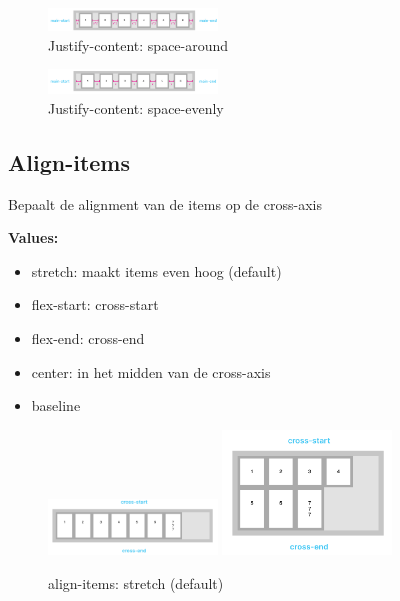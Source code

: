 \documentclass{article}
\newcommand{\bold}[1]{\textbf{#1}}
\begin{document}
\begin{figure}[H]
    \centering
    \includegraphics[width=0.4\textwidth]{img/Screenshot_20200427_093824.png}
    \caption{Justify-content: space-around}
\end{figure}

\begin{figure}[H]
    \centering
    \includegraphics[width=0.4\textwidth]{img/Screenshot_20200427_093901.png}
    \caption{Justify-content: space-evenly}
\end{figure}


\subsection{Align-items}
Bepaalt de alignment van de items op de cross-axis

\bold{Values:}
\begin{itemize}
    \item stretch: maakt items even hoog (default)
    \item flex-start: cross-start
    \item flex-end: cross-end
    \item center: in het midden van de cross-axis
    \item baseline
\end{itemize}

\begin{figure}[H]
    \centering
    \includegraphics[width=0.4\textwidth]{img/Screenshot_20200427_094108.png}
    \includegraphics[width=0.4\textwidth]{img/Screenshot_20200427_094153.png}
    \caption{align-items: stretch (default)}
\end{figure}
\end{document}
